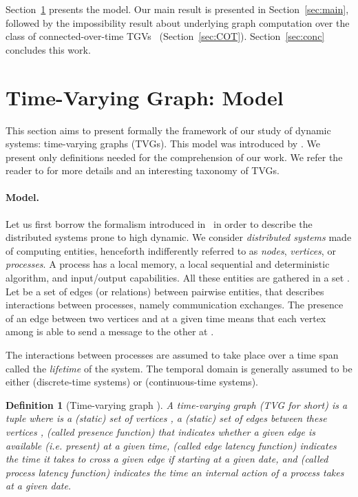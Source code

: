 \documentclass[11pt]{article}
\newtheorem{definition}{Definition}
\begin{document}
Section~\ref{sec:TVG} presents the model. Our main result is presented in Section~\ref{sec:main}, followed by the impossibility result about underlying graph computation over the class of connected-over-time TGVs~ (Section~\ref{sec:COT}). Section~\ref{sec:conc} concludes this work. 

\section{Time-Varying Graph: Model}\label{sec:TVG}

This section aims to present formally the framework of our study of dynamic systems: time-varying graphs (TVGs). This model was introduced by \cite{CFQS12}. We present only definitions needed for the comprehension of our work.  We refer the reader to \cite{CFQS12} for more details 
and an interesting taxonomy of TVGs. 

\paragraph{Model.}\label{sub:model}

Let us first borrow the formalism introduced in~\cite{CFQS12} in order to describe the distributed systems prone to high dynamic. We consider {\em distributed systems} made of  computing entities, henceforth indifferently referred to as {\em nodes}, {\em vertices}, or {\em processes}. A process has a local memory, a local sequential and deterministic algorithm, and input\slash output capabilities. All these entities are gathered in a set .  Let  be a set of edges (or relations) between pairwise entities, that describes interactions between processes, namely communication exchanges. The presence of an edge between two vertices  and  at a given time  means that each vertex among  is able to send a message to the other at .

The interactions between processes are assumed to take place over a time span  called the {\em lifetime} of the system. The temporal domain  is generally assumed to be either  (discrete-time systems) or  (continuous-time systems).

\begin{definition}[Time-varying graph \cite{CFQS12}]
\label{def:TVG}
A time-varying graph (TVG for short)  is a tuple  where  is a (static) set of vertices ,  a (static) set of edges between these vertices ,  (called presence function) that indicates whether a given edge is available (\emph{i.e.} present) at a given time,  (called edge latency function) indicates the time it takes to cross a given edge if starting at a given date, and  (called process latency function) indicates the time an internal action of a process takes at a given date.
\end{definition}
\end{document}
